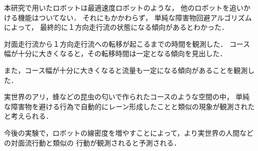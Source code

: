 本研究で用いたロボットは最適速度ロボット\cite{yamada19}のような，
他のロボットを追いかける機能はついてない．
それにもかかわらず，
単純な障害物回避アルゴリズムによって，
最終的に１方向走行流の状態になる傾向があるとわかった．

対面走行流から１方向走行流への転移が起こるまでの時間を観測した．
コース幅が十分に大きくなると，その転移時間は一定となる傾向を見出した．

また，コース幅が十分に大きくなると流量も一定になる傾向があることを観測した．

実世界のアリ，蜂などの昆虫の匂いで作られたコースのような空間の中，
単純な障害物を避ける行為で自動的にレーン形成したことと類似の現象が観測されたと考えられる．

今後の実験で，ロボットの線密度を増やすことによって，より実世界の人間などの対面流行動と類似の
行動が観測されると予測される．

